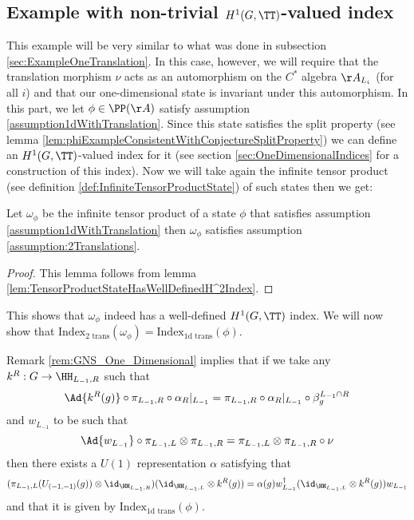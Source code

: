 \subsection{Example with non-trivial \texorpdfstring{$H^1(G,\TT)$}{}-valued index}\label{sec:ExampleTwoTranslations}
This example will be very similar to what was done in subsection \ref{sec:ExampleOneTranslation}. In this case, however, we will require that the translation morphism $\nu$ acts as an automorphism on the $C^*$ algebra $\AA_{L_i}$ (for all $i$) and that our one-dimensional state is invariant under this automorphism. In this part, we let $\phi\in\PP(\AA)$ satisfy assumption \ref{assumption1dWithTranslation}. Since this state satisfies the split property (see lemma \ref{lem:phiExampleConsistentWithConjectureSplitProperty}) we can define an $H^1(G,\TT)$-valued index for it (see section \ref{sec:OneDimensionalIndices} for a construction of this index). Now we will take again the infinite tensor product (see definition \ref{def:InfiniteTensorProductState}) of such states then we get:
\begin{lemma}
	Let $\omega_\phi$ be the infinite tensor product of a state $\phi$ that satisfies assumption \ref{assumption1dWithTranslation} then $\omega_\phi$ satisfies assumption \ref{assumption:2Translations}.
\end{lemma}
\begin{proof}
	This lemma follows from lemma \ref{lem:TensorProductStateHasWellDefinedH^2Index}.
\end{proof}
This shows that $\omega_\phi$ indeed has a well-defined $H^1(G,\TT)$ index. We will now show that $\textrm{Index}_{\text{2 trans}}(\omega_\phi)=\textrm{Index}_{\text{1d trans}}(\phi)$.
\begin{remark}\label{rem:GNS_One_DimensionalTwoTranslations}
	Remark \ref{rem:GNS_One_Dimensional} implies that if we take any $k^R:G\rightarrow \HH_{L_{-1},R}$ such that
	\begin{equation}
		\Ad{k^R(g)}\circ\pi_{L_{-1},R}\circ\alpha_R|_{L_{-1}}=\pi_{L_{-1},R}\circ\alpha_R|_{L_{-1}}\circ\beta_{g}^{L_{-1}\cap R}
	\end{equation}
	and $w_{L_{-1}}$ to be such that
	\begin{equation}
		\Ad{w_{L_{-1}}}\circ\pi_{L_{-1},L}\otimes \pi_{L_{-1},R}=\pi_{L_{-1},L}\otimes \pi_{L_{-1},R}\circ\nu
	\end{equation}
	then there exists a $U(1)$ representation $\alpha$ satisfying that
	\begin{equation}
		(\pi_{L_{-1},L}(U_{(-1,-1)}(g))\otimes \id_{\HH_{L_{-1},R}}) (\id_{\HH_{L_{-1},L}}\otimes k^R(g))=\alpha(g) w_{L_{-1}}^\dagger(\id_{\HH_{L_{-1},L}}\otimes k^R(g))w_{L_{-1}}
	\end{equation}
	and that it is given by $\textrm{Index}_{\text{1d trans}}(\phi)$.
\end{remark}
